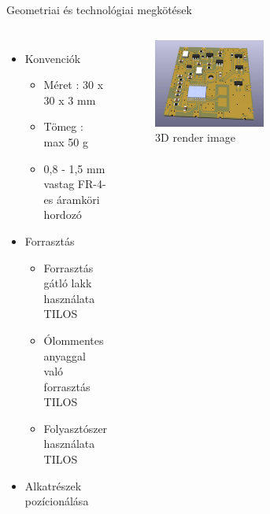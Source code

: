 \documentclass[aspectratio=169,xcolor=dvipsnames]{beamer}
\begin{document}
\begin{frame}{Geometriai és technológiai megkötések}


	\begin{columns}[c]
		\begin{itemize}
		\item Konvenciók
		\begin{itemize}
			\item Méret : 30 x 30 x 3 mm
			\item Tömeg : max 50 g
			\item 0,8 - 1,5 mm vastag FR-4-es áramköri hordozó
		\end{itemize}
		\item Forrasztás
			\begin{itemize}
				\item Forrasztás gátló lakk használata \alert{TILOS}
				\item Ólommentes anyaggal való forrasztás \alert{TILOS}
				\item Folyasztószer használata \alert{TILOS}
			\end{itemize}
		\item Alkatrészek pozícionálása
	\end{itemize}


		\begin{figure}[h]
		\centering
		\includegraphics[width=0.5\textwidth]{3d_render}
		\caption{3D render image}
		\end{figure}
		

	\end{columns}

  
\end{frame}
\end{document}
